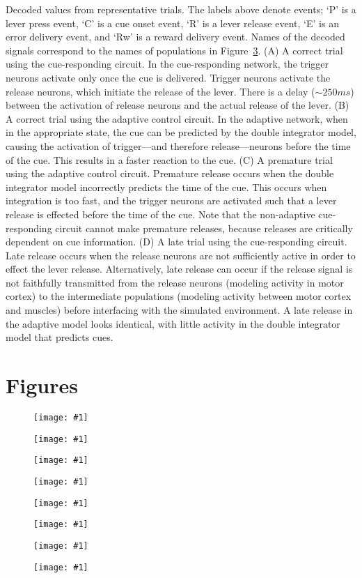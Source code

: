 \documentclass[11pt]{article}
\newcommand{\scalefigone}[3]{
  \begin{figure}[ht!]
    \centering
    \texttt{[image: \#1]}
    \caption{#3}
    \label{#1}
  \end{figure}}
\begin{document}
Decoded values from representative trials.
The labels above denote events;
`P' is a lever press event,
`C' is a cue onset event,
`R' is a lever release event,
`E' is an error delivery event,
and `Rw' is a reward delivery event.
Names of the decoded signals correspond
to the names of populations in Figure~\ref{fig3}.
(A) A correct trial using the cue-responding circuit.
In the cue-responding network, the trigger neurons
activate only once the cue is delivered.
Trigger neurons activate the release neurons,
which initiate the release of the lever.
There is a delay ($\sim 250ms$)
between the activation of release neurons
and the actual release of the lever.
(B) A correct trial using the adaptive control circuit.
In the adaptive network, when
in the appropriate state, the cue
can be predicted by the double integrator model,
causing the activation of trigger---and
therefore release---neurons before
the time of the cue. This results
in a faster reaction to the cue.
(C) A premature trial using the adaptive control circuit.
Premature release occurs when
the double integrator model incorrectly predicts
the time of the cue.
This occurs when integration is too fast,
and the trigger neurons are activated
such that a lever release is effected
before the time of the cue.
Note that the non-adaptive cue-responding
circuit cannot make premature releases,
because releases are critically dependent
on cue information.
(D) A late trial using the cue-responding circuit.
Late release occurs when
the release neurons are not sufficiently
active in order to effect the lever release.
Alternatively, late release can occur
if the release signal is not faithfully
transmitted from the release neurons
(modeling activity in motor cortex)
to the intermediate populations
(modeling activity between motor cortex and muscles)
before interfacing with the simulated environment.
A late release in the adaptive model
looks identical, with little activity
in the double integrator model that predicts cues.

\section{Figures}

\scalefigone{fig1}{0.5}{}

\scalefigone{fig2}{1.0}{}

\scalefigone{fig3}{0.8}{}

\scalefigone{fig4}{1.0}{}

\scalefigone{fig5}{1.0}{}

\scalefigone{fig6}{1.0}{}

\scalefigone{fig7}{1.0}{}

\scalefigone{fig8}{1.0}{}
\end{document}
